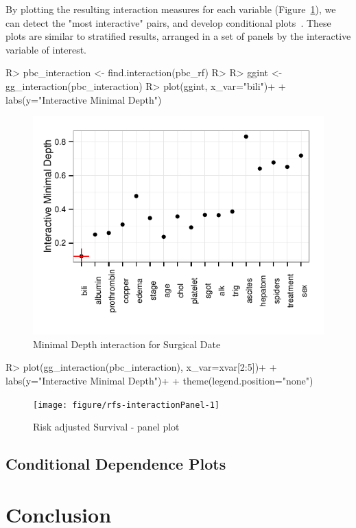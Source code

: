 \documentclass[nojss]{jss}\usepackage[]{graphicx}\usepackage[]{color}
\makeatletter
\def\maxwidth{ %
  \ifdim\Gin@nat@width>\linewidth
    \linewidth
  \else
    \Gin@nat@width
  \fi
}
\makeatother
\begin{document}
By plotting the resulting interaction measures for each variable (Figure~\ref{fig:interaction}), we can detect the "most interactive" pairs, and develop conditional plots~\cite{chambers:1992,cleveland:1993}. These plots are similar to stratified results, arranged in a set of panels by the interactive variable of interest. 
\begin{Schunk}
\begin{Sinput}
R> pbc_interaction <- find.interaction(pbc_rf)
R> 
R> ggint <- gg_interaction(pbc_interaction)
R> plot(ggint, x_var="bili")+
+   labs(y="Interactive Minimal Depth")
\end{Sinput}
\end{Schunk}
\begin{Schunk}
\begin{figure}[!htpb]

{\centering \includegraphics[width=\maxwidth]{figure/rfs-interaction-1} 

}

\caption[Minimal Depth interaction for Surgical Date]{Minimal Depth interaction for Surgical Date\label{fig:interaction}}
\end{figure}
\end{Schunk}

\begin{Schunk}
\begin{Sinput}
R> plot(gg_interaction(pbc_interaction), x_var=xvar[2:5])+
+   labs(y="Interactive Minimal Depth")+
+   theme(legend.position="none")
\end{Sinput}
\begin{figure}[!htpb]

{\centering \texttt{[image: figure/rfs-interactionPanel-1]} 

}

\caption[Risk adjusted Survival - panel plot]{Risk adjusted Survival - panel plot\label{fig:interactionPanel}}
\end{figure}
\end{Schunk}

\subsection{Conditional Dependence Plots}



\section{Conclusion}



\end{document}
